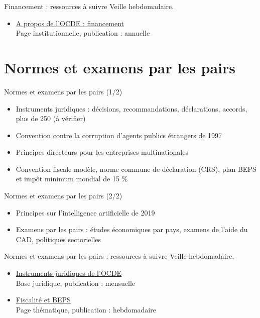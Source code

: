 \documentclass[aspectratio=169,11pt]{beamer}
\begin{document}
\begin{frame}{Financement : ressources à suivre}
\small
Veille hebdomadaire.
\begin{itemize}
\item \href{https://www.oecd.org/en/about.html}{A propos de l'OCDE : financement}\\{\footnotesize Page institutionnelle, publication : annuelle}
\end{itemize}
\end{frame}

\section{Normes et examens par les pairs}
\begin{frame}{Normes et examens par les pairs (1/2)}
\begin{itemize}
\item Instruments juridiques : décisions, recommandations, déclarations, accords, plus de 250 (à vérifier)
\item Convention contre la corruption d'agents publics étrangers de 1997
\item Principes directeurs pour les entreprises multinationales
\item Convention fiscale modèle, norme commune de déclaration (CRS), plan BEPS et impôt minimum mondial de 15 \%
\end{itemize}
\end{frame}

\begin{frame}{Normes et examens par les pairs (2/2)}
\begin{itemize}
\item Principes sur l'intelligence artificielle de 2019
\item Examens par les pairs : études économiques par pays, examens de l'aide du CAD, politiques sectorielles
\end{itemize}
\end{frame}

\begin{frame}{Normes et examens par les pairs : ressources à suivre}
\small
Veille hebdomadaire.
\begin{itemize}
\item \href{https://legalinstruments.oecd.org}{Instruments juridiques de l'OCDE}\\{\footnotesize Base juridique, publication : mensuelle}
\item \href{https://www.oecd.org/en/topics/policy-areas/tax.html}{Fiscalité et BEPS}\\{\footnotesize Page thématique, publication : hebdomadaire}
\end{itemize}
\end{frame}
\end{document}
